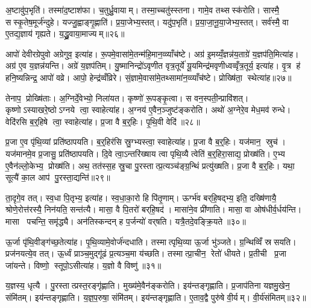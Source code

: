 अ॒ष्टावु॑प॒भृति॑। तस्मा॑द॒ष्टाश॑फा। च॒तुर्ध्रु॒वायाम्। तस्मा॒च्चतु॑स्स्तना। गामे॒व तथ्सस्क॑रोति। सास्मै॒ सस्कृ॒तेष॒मूर्ज॑न्दुहे। यज्जु॒ह्वाङ्गृ॒ह्णाति॑। प्र॒या॒जेभ्य॒स्तत्। यदु॑प॒भृति॑। प्र॒या॒जा॒नू॒या॒जेभ्य॒स्तत्। सर्व॑स्मै॒ वा ए॒तद्य॒ज्ञाय॑ गृह्यते। य॒द्ध्रु॒वाया॒माज्यम्॥२६॥\anuvakamend[अ॒भि॒घा॒रय॑ति गृह्णाति ध्रु॒वाया॒ञ्चतु॑ष्पदी प्रयाजानूया॒जेभ्य॒स्तद्द्वे च॑]

आपो॑ देवीरग्रेपुवो अग्रेगुव॒ इत्या॑ह। रू॒पमे॒वासा॑मे॒तन्म॑हि॒मान॒व्व्याँच॑ष्टे। अग्र॑ इ॒मय्यँ॒ज्ञन्न॑य॒ताग्रे॑ य॒ज्ञप॑ति॒मित्या॑ह। अग्र॑ ए॒व य॒ज्ञन्न॑यन्ति। अग्रे॑ य॒ज्ञप॑तिम्। यु॒ष्मानिन्द्रो॑ऽवृणीत वृत्र॒तूर्ये॑ यू॒यमिन्द्र॑मवृणीध्वव्वृँत्र॒तूर्य॒ इत्या॑ह। वृ॒त्र ह॑ हनि॒ष्यन्निन्द्र॒ आपो॑ वव्रे। आपो॒ हेन्द्र॑व्वँव्रिरे। सं॒ज्ञामे॒वासा॑मे॒तथ्सामा॑न॒व्व्याँच॑ष्टे। प्रोख्षि॑ता॒ स्थेत्या॑ह॥२७॥

तेनाप॒ प्रोख्षि॑ताः। अ॒ग्निर्दे॒वेभ्यो॒ निला॑यत। कृष्णो॑ रू॒पङ्कृ॒त्वा। स वन॒स्पती॒न्प्रावि॑शत्। कृष्णोऽस्याखरे॒ष्ठोऽग्नये त्वा॒ स्वाहेत्या॑ह। अ॒ग्नय॑ ए॒वैन॒ञ्जुष्ट॑ङ्करोति। अथो॑ अ॒ग्नेरे॒व मेध॒मव॑ रुन्धे। वेदि॑रसि ब॒र्॒हिषे त्वा॒ स्वाहेत्या॑ह। प्र॒जा वै ब॒र्॒हिः। पृ॒थि॒वी वेदि॑॥२८॥

प्र॒जा ए॒व पृ॑थि॒व्यां प्रति॑ष्ठापयति। ब॒र्॒हिर॑सि स्रु॒ग्भ्यस्त्वा॒ स्वाहेत्या॑ह। प्र॒जा वै ब॒र्॒हिः। यज॑मान॒ स्रुच॑। यज॑मानमे॒व प्र॒जासु॒ प्रति॑ष्ठापयति। दि॒वे त्वा॒ऽन्तरि॑ख्षाय त्वा पृथि॒व्यै त्वेति॑ ब॒र्॒हिरा॒साद्य॒ प्रोख्ष॑ति। ए॒भ्य ए॒वैन॑ल्लो॒केभ्य॒ प्रोख्ष॑ति। अथ॒ तत॑स्स॒ह स्रु॒चा पु॒रस्तात्प्र॒त्यञ्च॑ङ्ग्र॒न्थिं प्रत्यु॑ख्षति। प्र॒जा वै ब॒र्॒हिः। यथा॒ सूत्यै॑ का॒ल आप॑ पु॒रस्ता॒द्यन्ति॑॥२९॥

ता॒दृगे॒व तत्। स्व॒धा पि॒तृभ्य॒ इत्या॑ह। स्व॒धा॒का॒रो हि पि॑तृ॒णाम्। ऊर्ग्भ॑व बर्‌हि॒षद्भ्य॒ इति॒ दख्षि॑णायै॒ श्रोणे॒रोत्त॑रस्यै॒ निन॑यति॒ सन्त॑त्यै। मासा॒ वै पि॒तरो॑ बर्‌हि॒षद॑। मासा॑ने॒व प्री॑णाति। मासा॒ वा ओष॑धीर्व॒र्धय॑न्ति। मासा पचन्ति॒ समृ॑द्ध्यै। अन॑तिस्कन्दन् ह प॒र्जन्यो॑ वर्‌षति। यत्रै॒तदे॒वङ्क्रि॒यते॥३०॥

ऊ॒र्जा पृ॑थि॒वीङ्ग॑च्छ॒तेत्या॑ह। पृ॒थि॒व्यामे॒वोर्ज॑न्दधाति। तस्मात्पृथि॒व्या ऊ॒र्जा भु॑ञ्जते। ग्र॒न्थिव्विँ स्रसयति। प्रज॑नयत्ये॒व तत्। ऊ॒र्ध्वं प्राञ्च॒मुद्गू॑ढं प्र॒त्यञ्च॒मा य॑च्छति। तस्मात्प्रा॒चीन॒ रेतो॑ धीयते। प्र॒तीची प्र॒जा जा॑यन्ते। विष्णो॒ स्तूपो॒ऽसीत्या॑ह। य॒ज्ञो वै विष्णु॑॥३१॥

य॒ज्ञस्य॒ धृत्यै। पु॒रस्तात्प्रस्त॒रङ्गृ॑ह्णाति। मुख्य॑मे॒वैन॑ङ्करोति। इय॑न्तङ्गृह्णाति। प्र॒जाप॑तिना यज्ञमु॒खेन॒ संमि॑तम्। इय॑न्तङ्गृह्णाति। य॒ज्ञ॒प॒रुषा॒ संमि॑तम्। इय॑न्तङ्गृह्णाति। ए॒ताव॒द्वै पुरु॑षे वी॒र्यम्। वी॒र्य॑संमितम्॥३२॥


